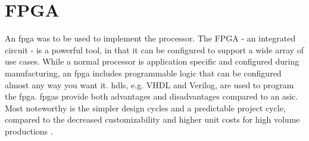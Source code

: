 \section{FPGA}
An \gls{fpga} was to be used to implement the processor.
The FPGA - an integrated circuit - is a powerful tool, in that it can be configured to support a wide array of use cases.
While a normal processor is application specific and configured during manufacturing, an \gls{fpga} includes programmable logic that can be configured almost any way you want it\cite{fpga}.
\gls{hdl}s, e.g. VHDL and Verilog, are used to program the \gls{fpga}.
\gls{fpga}s provide both advantages and disadvantages compared to an \gls{asic}.
Most noteworthy is the simpler design cycles and a predictable project cycle, compared to the decreased customizability and higher unit costs for high volume productions \cite{fpgavsasic}.
